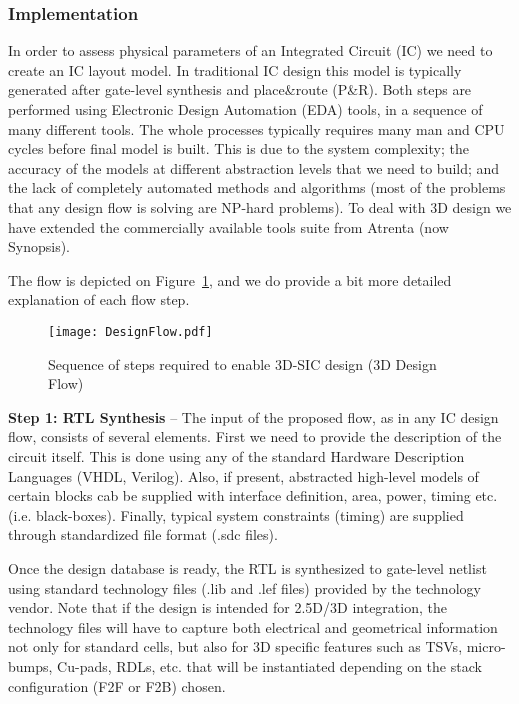 \subsubsection*{Implementation}
In order to assess physical parameters of an Integrated Circuit (IC) we need to create an IC layout model. In traditional IC design this model is typically generated after gate-level synthesis and place\&route (P\&R). Both steps are performed using Electronic Design Automation (EDA) tools, in a sequence of many different tools. The whole processes typically requires many man and CPU cycles before final model is built. This is due to the system complexity; the accuracy of the models at different abstraction levels that we need to build; and the lack of completely automated methods and algorithms (most of the problems that any design flow is solving are NP-hard problems). To deal with 3D design we have extended the commercially available tools suite from Atrenta (now Synopsis).

The flow is depicted on Figure~\ref{fig:3DFlow}, and we do provide a bit more detailed explanation of each flow step.

\begin{figure}[h!]%
\centering
\texttt{[image: DesignFlow.pdf]}
\caption{Sequence of steps required to enable 3D-SIC design (3D Design Flow)\label{fig:3DFlow}}
\end{figure}

\textbf{Step 1: RTL Synthesis} – The input of the proposed flow, as in any IC design flow, consists of several elements. First we need to provide the description of the circuit itself. This is done using any of the standard Hardware Description Languages (VHDL, Verilog). Also, if present, abstracted high-level models of certain blocks cab be supplied with interface definition, area, power, timing etc. (i.e. black-boxes). Finally, typical system constraints (timing) are supplied through standardized file format (.sdc files).

Once the design database is ready, the RTL is synthesized to gate-level netlist using standard technology files (.lib and .lef files) provided by the technology vendor. Note that if the design is intended for 2.5D/3D integration, the technology files will have to capture both electrical and geometrical information not only for standard cells, but also for 3D specific features such as TSVs, micro-bumps, Cu-pads, RDLs, etc. that will be instantiated depending on the stack configuration (F2F or F2B) chosen.

